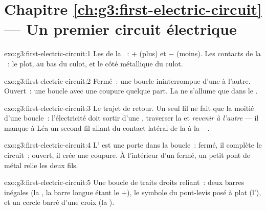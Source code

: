 \section*{Chapitre \ref{ch:g3:first-electric-circuit} --- Un premier circuit électrique}

\begin{solution}{exo:g3:first-electric-circuit:1}
Les  de la ~: $+$ (plus) et $-$ (moins). Les contacts de la
~: le plot, au bas du culot, et le côté métallique du culot.
\end{solution}

\begin{solution}{exo:g3:first-electric-circuit:2}
Fermé~: une boucle ininterrompue d'une  à l'autre. Ouvert~: une
boucle avec une coupure quelque part. La  ne s'allume que dans
le .
\end{solution}

\begin{solution}{exo:g3:first-electric-circuit:3}
Le trajet de retour. Un seul fil ne fait que la moitié d'une boucle~:
l'électricité doit sortir d'une , traverser la  et
\emph{revenir à l'autre } --- il manque à Léa un second fil
allant du contact latéral de la  à la  $-$.
\end{solution}

\begin{solution}{exo:g3:first-electric-circuit:4}
L' est une porte dans la boucle~: fermé, il complète le
circuit~; ouvert, il crée une coupure. À l'intérieur d'un
 fermé, un petit pont de métal relie les deux fils.
\end{solution}

\begin{solution}{exo:g3:first-electric-circuit:5}
Une boucle de traits droits reliant~: deux barres inégales (la ,
la barre longue étant le $+$), le symbole du pont-levis posé à plat
(l'), et un cercle barré d'une croix (la ).
\end{solution}

